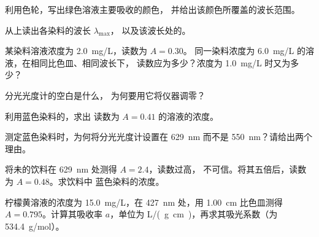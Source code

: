 \begin{exercise}[$\star$]\label{exo:g11:absorbance:2}
利用色轮，写出绿色溶液主要吸收的颜色，
并给出该颜色所覆盖的波长范围。
\end{exercise}

\begin{exercise}[$\star$]\label{exo:g11:absorbance:3}
从上读出各染料的波长 $\lambda_{\max}$，
以及该波长处的。
\end{exercise}

\begin{exercise}[$\star$]\label{exo:g11:absorbance:4}
某染料溶液浓度为 \qty{2.0}{mg/L}，读数为 $A = 0.30$。
同一染料浓度为 \qty{6.0}{mg/L} 的溶液，在相同比色皿、相同波长下，
读数应为多少？浓度为 \qty{1.0}{mg/L} 时又为多少？
\end{exercise}

\begin{exercise}[$\star$]\label{exo:g11:absorbance:5}
分光光度计的空白是什么，
为何要用它将仪器调零？
\end{exercise}

\begin{exercise}[$\star\star$]\label{exo:g11:absorbance:6}
利用蓝色染料的，求出
读数为 $A = 0.41$ 的溶液的浓度。
\end{exercise}

\begin{exercise}[$\star\star$]\label{exo:g11:absorbance:7}
测定蓝色染料时，为何将分光光度计设置在
\qty{629}{nm} 而不是 \qty{550}{nm}？请给出两个理由。
\end{exercise}

\begin{exercise}[$\star\star$]\label{exo:g11:absorbance:8}
将未的饮料在 \qty{629}{nm} 处测得 $A = 2.4$，读数过高，
不可信。将其五倍后，读数为 $A = 0.48$。求饮料中
蓝色染料的浓度。
\end{exercise}

\begin{exercise}[$\star\star$]\label{exo:g11:absorbance:9}
柠檬黄溶液的浓度为 \qty{15.0}{mg/L}，在
\qty{427}{nm} 处，用 \qty{1.00}{cm} 比色皿测得 $A = 0.795$。计算其吸收率 $a$，单位为
\si{L/(g.cm)}，再求其吸光系数（为
\qty{534.4}{g/mol}）。
\end{exercise}

